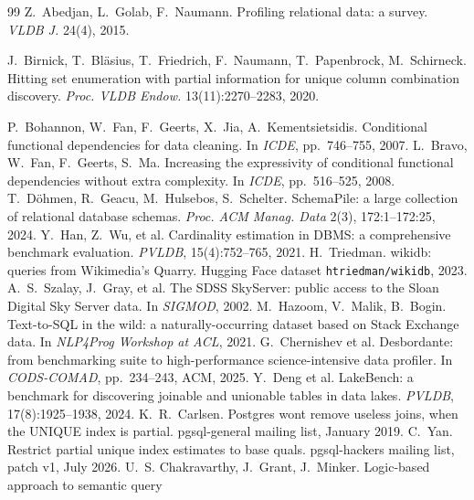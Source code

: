 \documentclass[conference]{IEEEtran}
\theoremstyle{definition}
\newcommand{\sql}[1]{\texttt{#1}}
\newif\ifextended
\begin{document}
\begin{thebibliography}{99}
 Z.~Abedjan, L.~Golab, F.~Naumann. Profiling relational data: a survey.
  \emph{VLDB J.} 24(4), 2015.
\ifextended
\bibitem{Ber89} C.~Berge. \emph{Hypergraphs: Combinatorics of Finite Sets}. North-Holland,
  1989.
\fi
{} J.~Birnick, T.~Bl\"asius, T.~Friedrich, F.~Naumann, T.~Papenbrock,
  M.~Schirneck. Hitting set enumeration with partial information for unique column combination
  discovery. \emph{Proc. VLDB Endow.} 13(11):2270--2283, 2020.
\ifextended
\bibitem{BFS22} T.~Bl\"asius, T.~Friedrich, M.~Schirneck. The complexity of dependency
  detection and discovery in relational databases. \emph{Theor. Comput. Sci.} 900:79--96,
  2022. %
\fi
{} P.~Bohannon, W.~Fan, F.~Geerts, X.~Jia, A.~Kementsietsidis. Conditional
  functional dependencies for data cleaning. In \emph{ICDE}, pp.~746--755, 2007.
 L.~Bravo, W.~Fan, F.~Geerts, S.~Ma. Increasing the expressivity of conditional
  functional dependencies without extra complexity. In \emph{ICDE}, pp.~516--525, 2008.
 T.~D\"ohmen, R.~Geacu, M.~Hulsebos, S.~Schelter. SchemaPile: a large collection of
  relational database schemas. \emph{Proc. ACM Manag. Data} 2(3), 172:1--172:25, 2024.
 Y.~Han, Z.~Wu, et al. Cardinality estimation in DBMS: a comprehensive
  benchmark evaluation. \emph{PVLDB}, 15(4):752--765, 2021.
 H.~Triedman. wikidb: queries from Wikimedia's Quarry. Hugging Face dataset
  \sql{htriedman/wikidb}, 2023.
 A.~S.~Szalay, J.~Gray, et al. The SDSS SkyServer: public access to the Sloan
  Digital Sky Server data. In \emph{SIGMOD}, 2002.
 M.~Hazoom, V.~Malik, B.~Bogin. Text-to-SQL in the wild: a naturally-occurring
  dataset based on Stack Exchange data. In \emph{NLP4Prog Workshop at ACL}, 2021.
 G.~Chernishev et al. Desbordante: from benchmarking suite to
  high-performance science-intensive data profiler. In \emph{CODS-COMAD}, pp.~234--243, ACM,
  2025.
 Y.~Deng et al. LakeBench: a benchmark for discovering joinable and
  unionable tables in data lakes. \emph{PVLDB}, 17(8):1925--1938, 2024.
 K.~R.~Carlsen. Postgres wont remove useless joins, when the UNIQUE index is
  partial. pgsql-general mailing list, January 2019.
 C.~Yan. Restrict partial unique index estimates to base quals. pgsql-hackers
  mailing list, patch v1, July 2026.
 U.~S. Chakravarthy, J.~Grant, J.~Minker. Logic-based approach to semantic query

\end{thebibliography}
\end{document}
